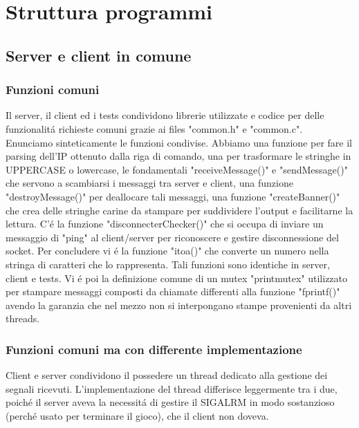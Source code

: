 \chapter{Struttura programmi}

\section{Server e client in comune}

\subsection{Funzioni comuni}

Il server, il client ed i tests condividono librerie utilizzate e codice per delle funzionalit\'a richieste comuni grazie ai files "common.h" e "common.c". 
\\
Enunciamo sinteticamente le funzioni condivise. Abbiamo una funzione per fare il parsing dell'IP ottenuto dalla riga di comando, una per trasformare le stringhe in UPPERCASE o lowercase, le fondamentali "receiveMessage()" e "sendMessage()" che servono a scambiarsi i messaggi tra server e client, una funzione "destroyMessage()" per deallocare tali messaggi, una funzione "createBanner()" che crea delle stringhe carine da stampare per suddividere l'output e facilitarne la lettura. C'\'e la funzione "disconnecterChecker()" che si occupa di inviare un messaggio di "ping" al client/server per riconoscere e gestire disconnessione del socket. Per concludere vi \'e la funzione "itoa()" che converte un numero nella stringa di caratteri che lo rappresenta. Tali funzioni sono identiche in server, client e tests. Vi \'e poi la definizione comune di un mutex "printmutex" utilizzato per stampare messaggi composti da chiamate differenti alla funzione "fprintf()" avendo la garanzia che nel mezzo non si interpongano stampe provenienti da altri threads.
 
 \subsection{Funzioni comuni ma con differente implementazione}

 Client e server condividono il possedere un thread dedicato alla gestione dei segnali ricevuti. L'implementazione del thread differisce leggermente tra i due, poich\'e il server aveva la necessit\'a di gestire il SIGALRM in modo sostanzioso (perch\'e usato per terminare il gioco), che il client non doveva.
  

